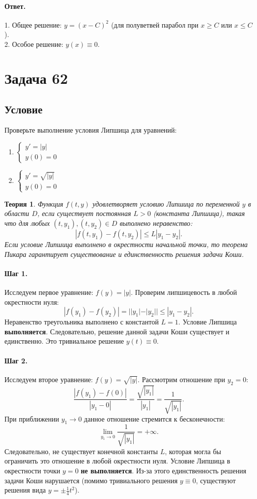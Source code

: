 \documentclass[12pt,a4paper]{article}
\theoremstyle{solution}
\newtheorem*{theory}{Теория}
\newcommand{\task}[1]{\newpage\section*{Задача #1}}
\newcommand{\answer}{\paragraph{Ответ.}}
\newcommand{\step}[1]{\paragraph{Шаг #1.}}
\begin{document}
\answer
1. Общее решение: $y = (x - C)^2$ (для полуветвей парабол при $x \geq C$ или $x \leq C$).\\
2. Особое решение: $y(x) \equiv 0$.

\task{62}
\subsection*{Условие}
Проверьте выполнение условия Липшица для уравнений:
\begin{enumerate}
    \item $\begin{cases} y' = |y| \\ y(0) = 0 \end{cases}$
    \item $\begin{cases} y' = \sqrt{|y|} \\ y(0) = 0 \end{cases}$
\end{enumerate}

\begin{theory}
Функция $f(t, y)$ удовлетворяет условию Липшица по переменной $y$ в области $D$, если существует постоянная $L > 0$ (константа Липшица), такая что для любых $(t, y_1), (t, y_2) \in D$ выполнено неравенство:
\[
|f(t, y_1) - f(t, y_2)| \leq L |y_1 - y_2|.
\]
Если условие Липшица выполнено в окрестности начальной точки, то теорема Пикара гарантирует существование и единственность решения задачи Коши.
\end{theory}

\step{1} Исследуем первое уравнение: $f(y) = |y|$.
Проверим липшицевость в любой окрестности нуля:
\[
|f(y_1) - f(y_2)| = ||y_1| - |y_2|| \leq |y_1 - y_2|.
\]
Неравенство треугольника выполнено с константой $L = 1$. Условие Липшица \textbf{выполняется}. Следовательно, решение данной задачи Коши существует и единственно. Это тривиальное решение $y(t) \equiv 0$.

\step{2} Исследуем второе уравнение: $f(y) = \sqrt{|y|}$.
Рассмотрим отношение при $y_2 = 0$:
\[
\frac{|f(y_1) - f(0)|}{|y_1 - 0|} = \frac{\sqrt{|y_1|}}{|y_1|} = \frac{1}{\sqrt{|y_1|}}.
\]
При приближении $y_1 \to 0$ данное отношение стремится к бесконечности:
\[
\lim_{y_1 \to 0} \frac{1}{\sqrt{|y_1|}} = +\infty.
\]
Следовательно, не существует конечной константы $L$, которая могла бы ограничить это отношение в любой окрестности нуля. Условие Липшица в окрестности точки $y = 0$ \textbf{не выполняется}. Из-за этого единственность решения задачи Коши нарушается (помимо тривиального решения $y \equiv 0$, существуют решения вида $y = \pm \frac{1}{4}t^2$).
\end{document}
